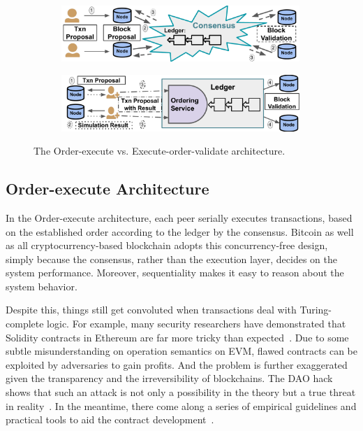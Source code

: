 \begin{figure}
    \centering
    \begin{subfigure}{0.8\textwidth}
      \includegraphics[width=0.99\textwidth]{diagram/literature/ox_arch.pdf}
    \end{subfigure}
    \begin{subfigure}{0.8\textwidth}
      \includegraphics[width=0.99\textwidth]{diagram/literature/eov_arch.pdf}
    \end{subfigure}
    \caption{The Order-execute vs. Execute-order-validate architecture. }
    \label{diagram:literature:execution}
\end{figure}

\subsection{Order-execute Architecture}
\label{ch:literature:execution:order-execute}
In the Order-execute architecture, each peer serially executes transactions, based on the established order according to the ledger by the consensus. 
Bitcoin as well as all cryptocurrency-based blockchain adopts this concurrency-free design, simply because the consensus, rather than the execution layer, decides on the system performance. 
Moreover, sequentiality makes it easy to reason about the system behavior. 

Despite this, things still get convoluted when transactions deal with Turing-complete logic. For example, many security researchers have demonstrated that Solidity contracts in Ethereum are far more tricky than expected~\cite{luu2016making,parizi2018smart,atzei2017survey}. 
Due to some subtle misunderstanding on operation semantics on EVM, flawed contracts can be exploited by adversaries to gain profits. 
And the problem is further exaggerated given the transparency and the irreversibility of blockchains. 
The DAO hack shows that such an attack is not only a possibility in the theory but a true threat in reality~\cite{santos2018dao}.
In the meantime, there come along a series of empirical guidelines and practical tools to aid the contract development~\cite{ducasse2019open,jeng2019step,bai2018formal,tikhomirov2018smartcheck}. 

